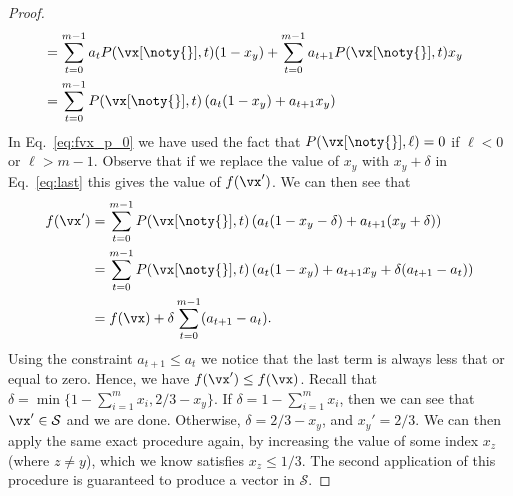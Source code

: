 \begin{proof}
\begin{align}
		       & = \sum_{t=0}^{m-1} a_t P(\vx[\noty{}],t) (1-x_y) + \sum_{t=0}^{m-1} a_{t+1} P(\vx[\noty{}], t) x_y & \label{eq:fvx_p_0}                           \\
		       & = \sum_{t=0}^{m-1} P(\vx[\noty{}],t) \left( a_t(1-x_y) + a_{t+1}x_y \right)                        & \label{eq:last}
	\end{align}
	In Eq.~\eqref{eq:fvx_p_0} we have used the fact that $P(\vx[\noty{}],\ell) = 0$ if $\ell < 0$ or $\ell > m-1$.
	Observe that if we replace the value of $x_y$ with $x_y + \delta$ in Eq.~\eqref{eq:last} this gives the value of $f(\vx')$. We can then see that
	\begin{align*}
		f(\vx') & = \sum_{t=0}^{m-1} P(\vx[\noty{}],t) \left( a_t(1-x_y - \delta) + a_{t+1}(x_y + \delta) \right)       \\
		        & = \sum_{t=0}^{m-1} P(\vx[\noty{}],t) \left( a_t(1-x_y) + a_{t+1}x_y + \delta (a_{t+1} - a_t)  \right) \\
		        & = f(\vx) + \delta \sum_{t=0}^{m-1} (a_{t+1} - a_t).
	\end{align*}
	Using the constraint $a_{t+1} \leq a_t$ we notice that the last term is always less that or equal to zero. Hence, we have $f(\vx') \leq f(\vx)$. Recall that $\delta = \min\{ 1 - \sum_{i =1}^m x_i, 2/3 - x_y\}$. If $\delta = 1 - \sum_{i=1}^m x_i$, then we can see that $\vx' \in \mathcal{S}$ and we are done. Otherwise, $\delta = 2/3- x_y$, and $x_y' = 2/3$. We can then apply the same exact procedure again, by increasing the value of some index $x_z$ (where $z \neq y$), which we know satisfies $x_z \leq 1/3$. The second application of this procedure is guaranteed to produce a vector in $\mathcal{S}$.



\end{proof}
